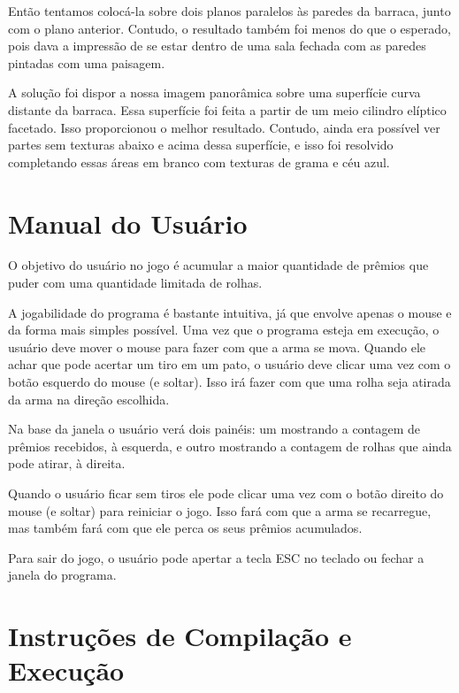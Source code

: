 \documentclass[a4paper,10pt]{article}
\begin{document}
Então tentamos colocá-la sobre dois planos paralelos às paredes da barraca, junto com o plano anterior. Contudo, o resultado também foi menos do que o esperado, pois dava a impressão de se estar dentro de uma sala fechada com as paredes pintadas com uma paisagem.

A solução foi dispor a nossa imagem panorâmica sobre uma superfície curva distante da barraca. Essa superfície foi feita a partir de um meio cilindro elíptico facetado. Isso proporcionou o melhor resultado. Contudo, ainda era possível ver partes sem texturas abaixo e acima dessa superfície, e isso foi resolvido completando essas áreas em branco com texturas de grama e céu azul.


\section{Manual do Usuário}

O objetivo do usuário no jogo é acumular a maior quantidade de prêmios que puder com uma quantidade limitada de rolhas.

A jogabilidade do programa é bastante intuitiva, já que envolve apenas o mouse e da forma mais simples possível. Uma vez que o programa esteja em execução, o usuário deve mover o mouse para fazer com que a arma se mova. Quando ele achar que pode acertar um tiro em um pato, o usuário deve clicar uma vez com o botão esquerdo do mouse (e soltar). Isso irá fazer com que uma rolha seja atirada da arma na direção escolhida.

Na base da janela o usuário verá dois painéis: um mostrando a contagem de prêmios recebidos, à esquerda, e outro mostrando a contagem de rolhas que ainda pode atirar, à direita.

Quando o usuário ficar sem tiros ele pode clicar uma vez com o botão direito do mouse (e soltar) para reiniciar o jogo. Isso fará com que a arma se recarregue, mas também fará com que ele perca os seus prêmios acumulados.

Para sair do jogo, o usuário pode apertar a tecla ESC no teclado ou fechar a janela do programa.


\section{Instruções de Compilação e Execução}
\end{document}
